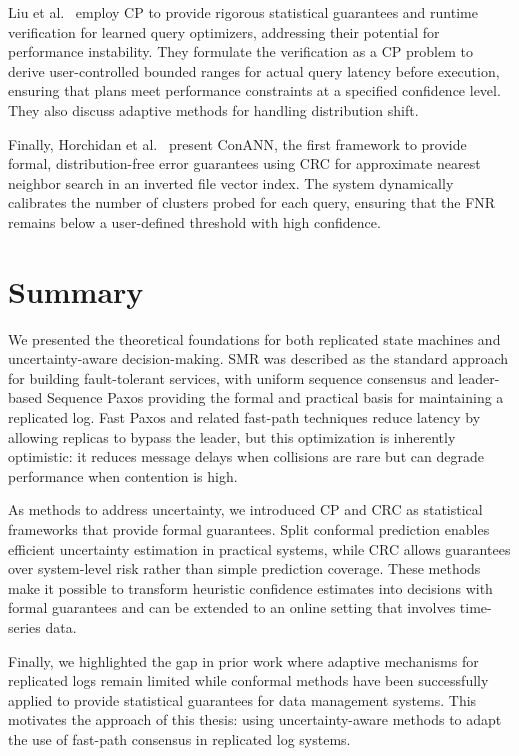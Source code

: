Liu et al.~\cite{Liu-ConformalPredictionQueryOptimization-2025} employ \gls{CP} to provide rigorous statistical guarantees and runtime verification for learned query optimizers, addressing their potential for performance instability. They formulate the verification as a \gls{CP} problem to derive user-controlled bounded ranges for actual query latency before execution, ensuring that plans meet performance constraints at a specified confidence level. They also discuss adaptive methods for handling distribution shift.

Finally, Horchidan et al.~\cite{Horchidan-ConANN-2025} present ConANN, the first framework to provide formal, distribution-free error guarantees using \gls{CRC} for approximate nearest neighbor search in an inverted file vector index. The system dynamically calibrates the number of clusters probed for each query, ensuring that the \gls{FNR} remains below a user-defined threshold with high confidence.

\section{Summary}
\label{sec:summary}

We presented the theoretical foundations for both replicated state machines and uncertainty-aware decision-making. \gls{SMR} was described as the standard approach for building fault-tolerant services, with uniform sequence consensus and leader-based Sequence Paxos providing the formal and practical basis for maintaining a replicated log. Fast Paxos and related fast-path techniques reduce latency by allowing replicas to bypass the leader, but this optimization is inherently optimistic: it reduces message delays when collisions are rare but can degrade performance when contention is high.

As methods to address uncertainty, we introduced \gls{CP} and \gls{CRC} as statistical frameworks that provide formal guarantees. Split conformal prediction enables efficient uncertainty estimation in practical systems, while \gls{CRC} allows guarantees over system-level risk rather than simple prediction coverage. These methods make it possible to transform heuristic confidence estimates into decisions with formal guarantees and can be extended to an online setting that involves time-series data.

Finally, we highlighted the gap in prior work where adaptive mechanisms for replicated logs remain limited while conformal methods have been successfully applied to provide statistical guarantees for data management systems. This motivates the approach of this thesis: using uncertainty-aware methods to adapt the use of fast-path consensus in replicated log systems.